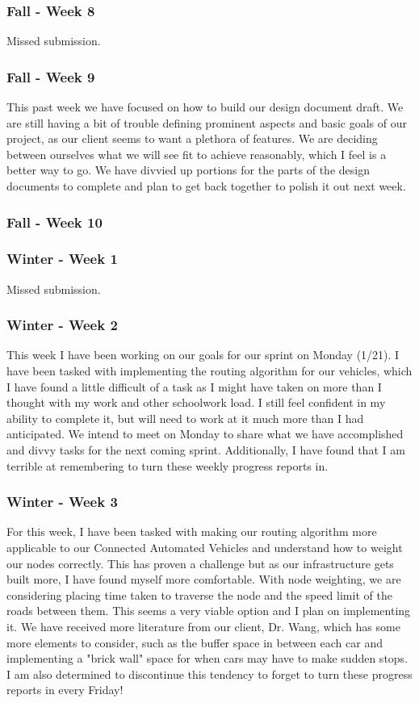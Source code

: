 \documentclass[onecolumn, draftclsnofoot,10pt, compsoc]{IEEEtran}
\begin{document}
\subsubsection{Fall - Week 8}
Missed submission.
\subsubsection{Fall - Week 9}
This past week we have focused on how to build our design document draft.
We are still having a bit of trouble defining prominent aspects and basic goals of our project, as our client seems to want a plethora of features.
We are deciding between ourselves what we will see fit to achieve reasonably, which I feel is a better way to go.
We have divvied up portions for the parts of the design documents to complete and plan to get back together to polish it out next week.
\subsubsection{Fall - Week 10}
\subsubsection{Winter - Week 1}
Missed submission.
\subsubsection{Winter - Week 2}
This week I have been working on our goals for our sprint on Monday (1/21).
I have been tasked with implementing the routing algorithm for our vehicles, which I have found a little difficult of a task as I might have taken on more than I thought with my work and other schoolwork load.
I still feel confident in my ability to complete it, but will need to work at it much more than I had anticipated.
We intend to meet on Monday to share what we have accomplished and divvy tasks for the next coming sprint.
Additionally, I have found that I am terrible at remembering to turn these weekly progress reports in.
\subsubsection{Winter - Week 3}
For this week, I have been tasked with making our routing algorithm more applicable to our Connected Automated Vehicles and understand how to weight our nodes correctly.
This has proven a challenge but as our infrastructure gets built more, I have found myself more comfortable.
With node weighting, we are considering placing time taken to traverse the node and the speed limit of the roads between them.
This seems a very viable option and I plan on implementing it.
We have received more literature from our client, Dr. Wang, which has some more elements to consider, such as the buffer space in between each car and implementing a "brick wall" space for when cars may have to make sudden stops.
I am also determined to discontinue this tendency to forget to turn these progress reports in every Friday!
\end{document}
